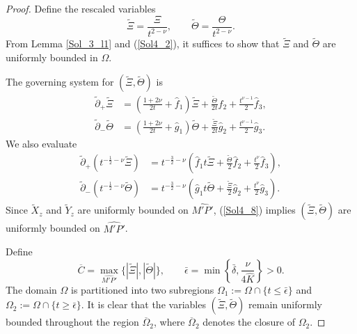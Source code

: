 \documentclass[3p,11pt]{elsarticle}
\numberwithin{equation}{section}
\begin{document}
\begin{proof} 
    Define the rescaled variables
\begin{equation}\label{Sol4_14}
\widetilde \Xi=\frac{\Xi}{t^{2-\nu}},\qquad \widetilde \Theta=\frac{\Theta}{t^{2-\nu}}.
\end{equation}
From Lemma \ref{Sol_3_l1} and (\ref{Sol4_2}), it suffices to show that $\widetilde \Xi$ and $\widetilde \Theta$ are uniformly bounded in $\Omega$.

The governing system for $(\widetilde \Xi, \widetilde \Theta)$ is
\begin{equation*}\label{Sol4_15}
\begin{split}
    \tilde{\partial}_+\widetilde \Xi
&=\left(\frac{1+2\nu}{2t}+\hat f_1\right)\widetilde\Xi
+\frac{\widetilde \Theta}{2t}\hat f_2+\frac{t^{\nu-1}}{2}\hat f_{3},\\
\tilde{\partial}_-\widetilde\Theta
&=\left(\frac{1+2\nu}{2t}+\hat g_1\right)\widetilde\Theta+\frac{\widetilde \Xi}{2t}\hat g_2+\frac{t^{\nu-1}}{2}\hat g_{3}.
\end{split}
\end{equation*}
We also evaluate
\begin{equation}\label{Sol4_16}
\begin{split}
    \tilde{\partial}_+\left(t^{-\frac{1}{2}-\nu}\widetilde \Xi \right)
&=t^{-\frac{3}{2}-\nu}\left(\hat f_1t\widetilde\Xi+\frac{\widetilde \Theta}{2}\hat f_2+\frac{t^{\nu}}{2}\hat f_{3}\right),\\
\tilde{\partial}_-\left(t^{-\frac{1}{2}-\nu}\widetilde\Theta \right)
&=t^{-\frac{3}{2}-\nu}\left(\hat g_1t\widetilde\Theta+\frac{\widetilde \Xi}{2}\hat g_2+\frac{t^{\nu}}{2}\hat g_{3}\right).
\end{split}
\end{equation}
Since $\widetilde X_{z}$ and $\widetilde Y_{z}$ are uniformly bounded on $\widehat{M'P'}$, (\ref{Sol4_8}) implies $(\widetilde \Xi, \widetilde\Theta)$ are uniformly bounded on $\widehat{M'P'}$.

Define
\begin{equation}\label{Sol4_17}
\overline C=\max_{\widehat{M'P'}}\{|\widetilde\Xi|, |\widetilde\Theta|\},\qquad
\bar{\epsilon}=\min\left\{\bar{\delta},\frac{\nu}{4\hat K}\right\}>0.
\end{equation}
The domain $\Omega$ is partitioned into two subregions
$\Omega_{1}:=\Omega\cap \{t\le \bar{\epsilon}\}$ and $\Omega_{2}:=\Omega\cap \{t\ge \bar{\epsilon}\}$. It is clear that the variables $(\widetilde \Xi, \widetilde\Theta)$ remain uniformly bounded throughout the region $\overline\Omega_{2}$, where $\overline\Omega_{2}$ denotes the closure of $\Omega_{2}$.


\end{proof}
\end{document}
